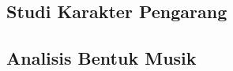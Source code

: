 \documentclass[fleqn,10pt]{SelfArx} %
\begin{document}
\subsection{Studi Karakter Pengarang}

\subsection{Analisis Bentuk Musik}








\end{document}
